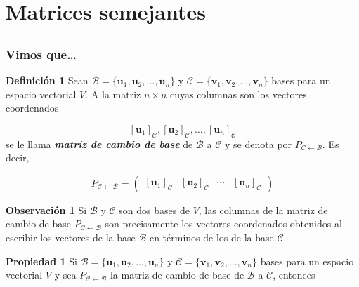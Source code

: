\section{Matrices semejantes}

\subsection{}

{\nologo
\begin{frame}\frametitle{Vimos que\ldots }

\vspace{-2mm}
\begin{defi}{\textbf{Definición 1}}\justifying
	Sean $\mathcal{B}=\{\mathbf{u}_1, \mathbf{u}_2, \hdots , \mathbf{u}_n \}$ y $\mathcal{C}=\{\mathbf{v}_1, \mathbf{v}_2, \hdots , \mathbf{v}_n \}$  bases para un espacio  vectorial $V$. A la matriz $n\times n$ cuyas columnas son los vectores coordenados
	
	\vspace{-2mm}
	\[
	\left[ \mathbf{u}_1 \right]_{\mathcal{C}}, \left[ \mathbf{u}_2 \right]_{\mathcal{C}}, \hdots, \left[ \mathbf{u}_n \right]_{\mathcal{C}}
	\]
	se le llama \textbf{\textit{matriz de cambio de base}} de $\mathcal{B}$ a $\mathcal{C}$ y se denota por $P_{\mathcal{C} \leftarrow\mathcal{B}}$. Es decir,	
	
	\vspace{-5mm}
	\[	
	P_{\mathcal{C} \leftarrow\mathcal{B}} =
	\left( 
	\begin{array}{c|c|c|c} \left[ \mathbf{u}_1 \right]_{\mathcal{C}} & \left[ \mathbf{u}_2 \right]_{\mathcal{C}} & \cdots & \left[ \mathbf{u}_n \right]_{\mathcal{C}}
	\end{array} 
	\right)
	\]
\end{defi}	

\vspace{-1mm}

\begin{alertblock}{\textbf{Observación 1 }}\justifying 
Si $\mathcal{B}$ y $\mathcal{C}$ son dos bases de $V$, las columnas de la matriz de cambio de base $P_{\mathcal{C} \leftarrow\mathcal{B}}$ son precisamente los vectores 
coordenados obtenidos al escribir los vectores de la base $\mathcal{B}$ en términos de los de la base $\mathcal{C}$.
\end{alertblock}

\vspace{-1mm}

\begin{prop}{\textbf{Propiedad 1}}
	\justifying
	Si $\mathcal{B}=\{\mathbf{u}_1, \mathbf{u}_2, \hdots , \mathbf{u}_n \}$ y $\mathcal{C}=\{\mathbf{v}_1, \mathbf{v}_2, \hdots , \mathbf{v}_n \}$  bases para un espacio  vectorial $V$ y sea $P_{\mathcal{C} \leftarrow\mathcal{B}}$ la matriz de cambio 
	de base de $\mathcal{B}$ a $\mathcal{C}$, entonces
	

\end{prop}
\end{frame}}

